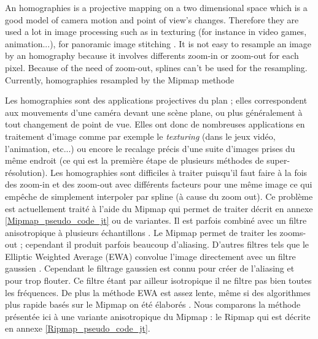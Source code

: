 
An homographies is a projective mapping on a two dimensional space which is a good model of camera motion and point of view's changes. Therefore they are used a lot in image processing such as in texturing \cite{heckbert1983texture} (for instance in video games, animation...), for panoramic image stitching \cite{brown2007automatic}. It is not easy to resample an image by an homography because it involves differents zoom-in or zoom-out for each pixel. Because of the need of zoom-out, splines can't be used for the resampling. Currently, homographies resampled by the Mipmap methode








Les homographies sont des applications projectives du plan ; elles correspondent aux mouvements d'une caméra devant une scène plane, ou plus généralement à tout changement de point de vue. Elles ont donc de nombreuses applications en traitement d'image comme par exemple le \emph{texturing} \cite{heckbert1983texture} (dans le jeux vidéo, l'animation, etc...) ou encore le recalage précis d'une suite d'images prises du même endroit \cite{brown2007automatic} (ce qui est la première étape de plusieurs méthodes de super-résolution). Les homographies sont difficiles à traiter puisqu'il faut faire à la fois des zoom-in et des zoom-out avec différents facteurs pour une même image ce qui empêche de simplement interpoler par spline (à cause du zoom out).  Ce problème est actuellement traité à l'aide du Mipmap qui permet de traiter \cite{williams1983pyramidal} décrit en annexe \ref{Mipmap_pseudo_code_jt} ou de variantes. Il est parfois combiné avec un filtre anisotropique à plusieurs échantillons  \cite{barkans1997high}. Le Mipmap permet de traiter les zooms-out ; cependant il produit parfois beaucoup d'aliasing.  D'autres filtres tels que le Elliptic Weighted Average (EWA) convolue l'image directement avec un filtre gaussien \cite{greene1986creating}. Cependant le filtrage gaussien est connu pour créer de l'aliasing et pour trop flouter. Ce filtre étant par ailleur isotropique il ne filtre pas bien toutes les fréquences. De plus la méthode EWA est assez lente, même si des algorithmes plus rapide basés sur le Mipmap on été élaborés \cite{mccormack1999feline,huttner1999fast}. Nous comparons la méthode présentée ici à une variante anisotropique du Mipmap : le Ripmap \cite{akenine2008real} qui est décrite en annexe \ref{Ripmap_pseudo_code_jt}.

